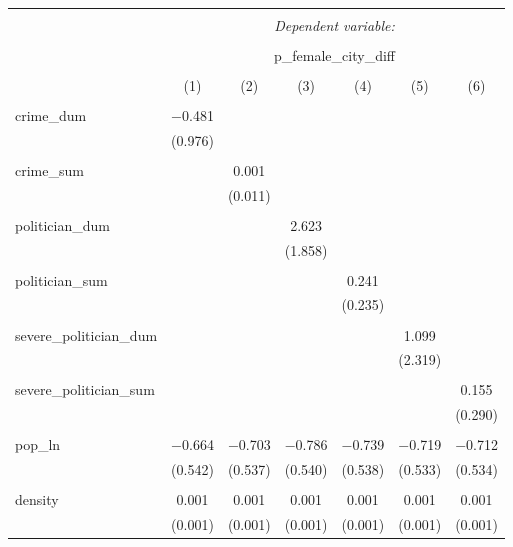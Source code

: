 
\begin{table}[!htbp] \centering 
  \caption{} 
  \label{} 
\begin{tabular}{@{\extracolsep{5pt}}lcccccc} 
\\[-1.8ex]\hline 
\hline \\[-1.8ex] 
 & \multicolumn{6}{c}{\textit{Dependent variable:}} \\ 
\cline{2-7} 
\\[-1.8ex] & \multicolumn{6}{c}{p\_female\_city\_diff} \\ 
\\[-1.8ex] & (1) & (2) & (3) & (4) & (5) & (6)\\ 
\hline \\[-1.8ex] 
 crime\_dum & $-$0.481 &  &  &  &  &  \\ 
  & (0.976) &  &  &  &  &  \\ 
  & & & & & & \\ 
 crime\_sum &  & 0.001 &  &  &  &  \\ 
  &  & (0.011) &  &  &  &  \\ 
  & & & & & & \\ 
 politician\_dum &  &  & 2.623 &  &  &  \\ 
  &  &  & (1.858) &  &  &  \\ 
  & & & & & & \\ 
 politician\_sum &  &  &  & 0.241 &  &  \\ 
  &  &  &  & (0.235) &  &  \\ 
  & & & & & & \\ 
 severe\_politician\_dum &  &  &  &  & 1.099 &  \\ 
  &  &  &  &  & (2.319) &  \\ 
  & & & & & & \\ 
 severe\_politician\_sum &  &  &  &  &  & 0.155 \\ 
  &  &  &  &  &  & (0.290) \\ 
  & & & & & & \\ 
 pop\_ln & $-$0.664 & $-$0.703 & $-$0.786 & $-$0.739 & $-$0.719 & $-$0.712 \\ 
  & (0.542) & (0.537) & (0.540) & (0.538) & (0.533) & (0.534) \\ 
  & & & & & & \\ 
 density & 0.001 & 0.001 & 0.001 & 0.001 & 0.001 & 0.001 \\ 
  & (0.001) & (0.001) & (0.001) & (0.001) & (0.001) & (0.001) \\ 

\end{tabular}
\end{table}
